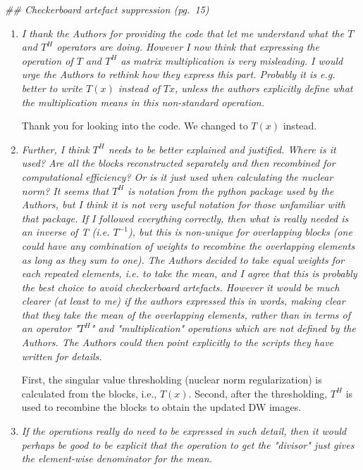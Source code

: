 \documentclass[a4paper,11pt,twoside]{report}
\begin{document}
\noindent \textit{\#\# Checkerboard artefact suppression (pg.~15)}

\begin{enumerate}
    \item \textit{I thank the Authors for providing the code that let me understand what the $T$ and $T^H$ operators are doing. However I now think that expressing the operation of $T$ and $T^H$ as matrix multiplication is very misleading. I would urge the Authors to rethink how they express this part. Probably it is e.g. better to write $T(x)$ instead of $Tx$, unless the authors explicitly define what the multiplication means in this non-standard operation.}

    \hspace{1em} {\color{blue} Thank you for looking into the code.
    We changed to $T(x)$ instead.}

    \item \textit{Further, I think $T^H$ needs to be better explained and justified. Where is it used? Are all the blocks reconstructed separately and then recombined for computational efficiency? Or is it just used when calculating the nuclear norm? It seems that $T^H$ is notation from the python package used by the Authors, but I think it is not very useful notation for those unfamiliar with that package. If I followed everything correctly, then what is really needed is an inverse of T (i.e. $T^{-1}$), but this is non-unique for overlapping blocks (one could have any combination of weights to recombine the overlapping elements as long as they sum to one). The Authors decided to take equal weights for each repeated elements, i.e. to take the mean, and I agree that this is probably the best choice to avoid checkerboard artefacts. However it would be much clearer (at least to me) if the authors expressed this in words, making clear that they take the mean of the overlapping elements, rather than in terms of an operator "$T^H$" and "multiplication" operations which are not defined by the Authors. The Authors could then point explicitly to the scripts they have written for details.}

    \hspace{1em} {\color{blue}
    First, the singular value thresholding (nuclear norm regularization)
    is calculated from the blocks, i.e., $T(x)$.
    Second, after the thresholding, $T^H$ is used to
    recombine the blocks to obtain the updated DW images.
    }

    \item \textit{If the operations really do need to be expressed in such detail, then it would perhaps be good to be explicit that the operation to get the "divisor" just gives the element-wise denominator for the mean.}


\end{enumerate}
\end{document}
